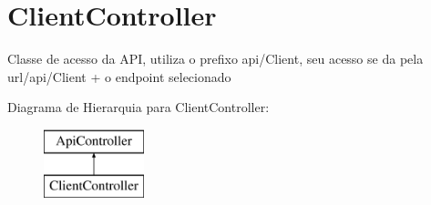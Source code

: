 \hypertarget{classApi3Layers_1_1Controllers_1_1ClientController}{}\section{Client\+Controller}
\label{classApi3Layers_1_1Controllers_1_1ClientController}


Classe de acesso da A\+PI, utiliza o prefixo api/\+Client, seu acesso se da pela url/api/\+Client + o endpoint selecionado  


Diagrama de Hierarquia para Client\+Controller\+:\begin{figure}[H]
\begin{center}
\leavevmode
\includegraphics[height=2.000000cm]{classApi3Layers_1_1Controllers_1_1ClientController}
\end{center}
\end{figure}
